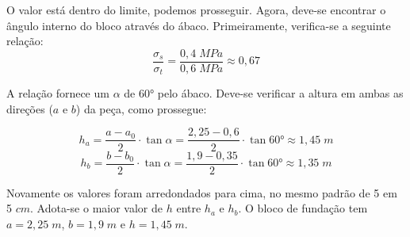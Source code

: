 O valor está dentro do limite, podemos prosseguir. Agora, deve-se encontrar o ângulo interno do bloco através do ábaco. Primeiramente, verifica-se a seguinte relação: $$\frac{\sigma_s}{\sigma_t}=\frac{0,4\;MPa}{0,6\;MPa}\approx 0,67$$

A relação fornece um $\alpha$ de $\ang{60}$ pelo ábaco. Deve-se verificar a altura em ambas as direções ($a$ e $b$) da peça, como prossegue:

$$h_a=\frac{a-a_0}{2}\cdot \tan{\alpha}=\frac{2,25-0,6}{2}\cdot \tan{\ang{60}}\approx 1,45\;m$$
$$h_b=\frac{b-b_0}{2}\cdot \tan{\alpha}=\frac{1,9-0,35}{2}\cdot \tan{\ang{60}}\approx 1,35\;m$$

Novamente os valores foram arredondados para cima, no mesmo padrão de 5 em 5 $cm$. Adota-se o maior valor de $h$ entre $h_a$ e $h_b$. O bloco de fundação tem $a=2,25\;m$, $b=1,9\;m$ e $h=1,45\;m$.

